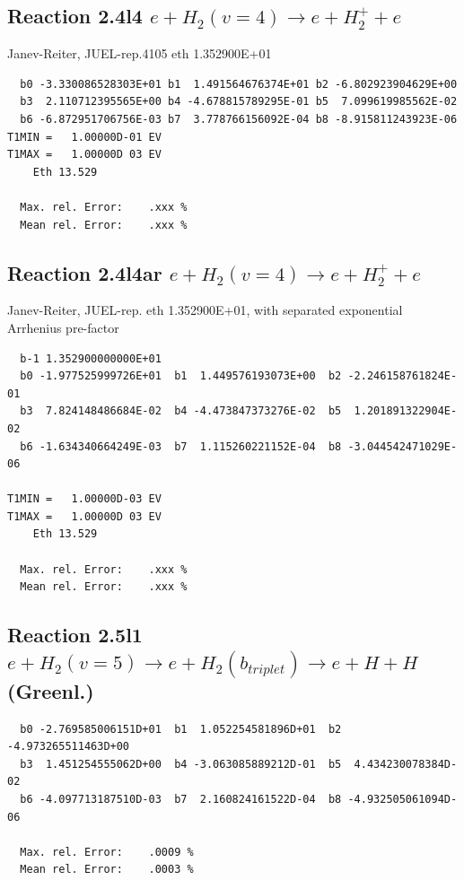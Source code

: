 \documentclass[12pt,dvipdfmx]{article}
\begin{document}
\subsection{
Reaction 2.4l4
 $ e + H_2(v=4) \rightarrow e + H_2^+  + e$
}
Janev-Reiter, JUEL-rep.4105 \cite{kn:JRS} eth 1.352900E+01

\begin{small}\begin{verbatim}
  b0 -3.330086528303E+01 b1  1.491564676374E+01 b2 -6.802923904629E+00
  b3  2.110712395565E+00 b4 -4.678815789295E-01 b5  7.099619985562E-02
  b6 -6.872951706756E-03 b7  3.778766156092E-04 b8 -8.915811243923E-06
T1MIN =   1.00000D-01 EV
T1MAX =   1.00000D 03 EV
    Eth 13.529

  Max. rel. Error:    .xxx %
  Mean rel. Error:    .xxx %
\end{verbatim}\end{small}

\subsection{
Reaction 2.4l4ar
 $ e + H_2(v=4) \rightarrow e + H_2^+  + e$
}
Janev-Reiter, JUEL-rep. eth 1.352900E+01,
with separated exponential Arrhenius pre-factor

\begin{small}\begin{verbatim}
  b-1 1.352900000000E+01
  b0 -1.977525999726E+01  b1  1.449576193073E+00  b2 -2.246158761824E-01
  b3  7.824148486684E-02  b4 -4.473847373276E-02  b5  1.201891322904E-02
  b6 -1.634340664249E-03  b7  1.115260221152E-04  b8 -3.044542471029E-06

T1MIN =   1.00000D-03 EV
T1MAX =   1.00000D 03 EV
    Eth 13.529

  Max. rel. Error:    .xxx %
  Mean rel. Error:    .xxx %
\end{verbatim}\end{small}


\newpage
\subsection{
Reaction 2.5l1
$ e + H_2(v=5) \rightarrow e +  H_2(b_{triplet})\rightarrow e + H + H $ (Greenl.)
}


\begin{small}\begin{verbatim}
  b0 -2.769585006151D+01  b1  1.052254581896D+01  b2 -4.973265511463D+00
  b3  1.451254555062D+00  b4 -3.063085889212D-01  b5  4.434230078384D-02
  b6 -4.097713187510D-03  b7  2.160824161522D-04  b8 -4.932505061094D-06

  Max. rel. Error:    .0009 %
  Mean rel. Error:    .0003 %

\end{verbatim}\end{small}
\end{document}
